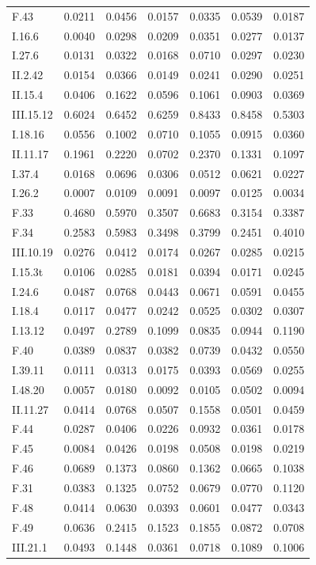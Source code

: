 \begin{longtable}{lrrrrrr}
F.43 & 0.0211 & 0.0456 & 0.0157 & 0.0335 & 0.0539 & 0.0187 \\
I.16.6 & 0.0040 & 0.0298 & 0.0209 & 0.0351 & 0.0277 & 0.0137 \\
I.27.6 & 0.0131 & 0.0322 & 0.0168 & 0.0710 & 0.0297 & 0.0230 \\
II.2.42 & 0.0154 & 0.0366 & 0.0149 & 0.0241 & 0.0290 & 0.0251 \\
II.15.4 & 0.0406 & 0.1622 & 0.0596 & 0.1061 & 0.0903 & 0.0369 \\
III.15.12 & 0.6024 & 0.6452 & 0.6259 & 0.8433 & 0.8458 & 0.5303 \\
I.18.16 & 0.0556 & 0.1002 & 0.0710 & 0.1055 & 0.0915 & 0.0360 \\
II.11.17 & 0.1961 & 0.2220 & 0.0702 & 0.2370 & 0.1331 & 0.1097 \\
I.37.4 & 0.0168 & 0.0696 & 0.0306 & 0.0512 & 0.0621 & 0.0227 \\
I.26.2 & 0.0007 & 0.0109 & 0.0091 & 0.0097 & 0.0125 & 0.0034 \\
F.33 & 0.4680 & 0.5970 & 0.3507 & 0.6683 & 0.3154 & 0.3387 \\
F.34 & 0.2583 & 0.5983 & 0.3498 & 0.3799 & 0.2451 & 0.4010 \\
III.10.19 & 0.0276 & 0.0412 & 0.0174 & 0.0267 & 0.0285 & 0.0215 \\
I.15.3t & 0.0106 & 0.0285 & 0.0181 & 0.0394 & 0.0171 & 0.0245 \\
I.24.6 & 0.0487 & 0.0768 & 0.0443 & 0.0671 & 0.0591 & 0.0455 \\
I.18.4 & 0.0117 & 0.0477 & 0.0242 & 0.0525 & 0.0302 & 0.0307 \\
I.13.12 & 0.0497 & 0.2789 & 0.1099 & 0.0835 & 0.0944 & 0.1190 \\
F.40 & 0.0389 & 0.0837 & 0.0382 & 0.0739 & 0.0432 & 0.0550 \\
I.39.11 & 0.0111 & 0.0313 & 0.0175 & 0.0393 & 0.0569 & 0.0255 \\
I.48.20 & 0.0057 & 0.0180 & 0.0092 & 0.0105 & 0.0502 & 0.0094 \\
II.11.27 & 0.0414 & 0.0768 & 0.0507 & 0.1558 & 0.0501 & 0.0459 \\
F.44 & 0.0287 & 0.0406 & 0.0226 & 0.0932 & 0.0361 & 0.0178 \\
F.45 & 0.0084 & 0.0426 & 0.0198 & 0.0508 & 0.0198 & 0.0219 \\
F.46 & 0.0689 & 0.1373 & 0.0860 & 0.1362 & 0.0665 & 0.1038 \\
F.31 & 0.0383 & 0.1325 & 0.0752 & 0.0679 & 0.0770 & 0.1120 \\
F.48 & 0.0414 & 0.0630 & 0.0393 & 0.0601 & 0.0477 & 0.0343 \\
F.49 & 0.0636 & 0.2415 & 0.1523 & 0.1855 & 0.0872 & 0.0708 \\
III.21.1 & 0.0493 & 0.1448 & 0.0361 & 0.0718 & 0.1089 & 0.1006 \\
\bottomrule\end{longtable}
